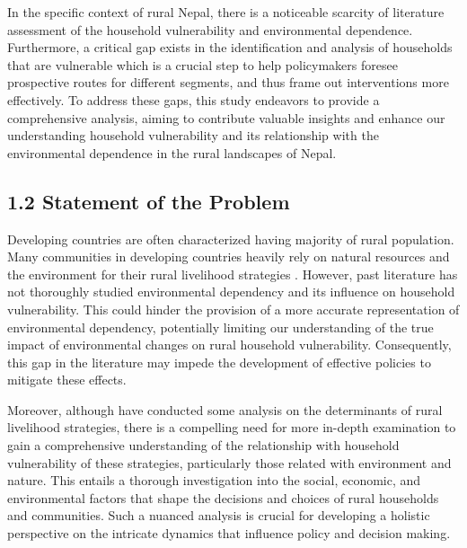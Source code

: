 \documentclass[12pt, a4paper]{article}
\begin{document}
In the specific context of rural Nepal, there is a noticeable scarcity of literature assessment of the household vulnerability and environmental dependence. Furthermore, a critical gap exists in the identification and analysis of households that are vulnerable which is a crucial step to help policymakers foresee prospective routes for different segments, and thus frame out interventions more effectively. To address these gaps, this study endeavors to provide a comprehensive analysis, aiming to contribute valuable insights and enhance our understanding household vulnerability and its relationship with the environmental dependence in the rural landscapes of Nepal.

\subsection*{1.2 Statement of the Problem }
\renewcommand{\thepage}{\arabic{page}}
Developing countries are often characterized having majority of rural population. Many communities in developing countries heavily rely on natural resources and the environment for their rural livelihood strategies \citep{adger2000social, ahmadpour2020factors, chambers1992sustainable, ellis1999rural}. However, past literature has not thoroughly studied environmental dependency and its influence on household vulnerability. This could hinder the provision of a more accurate representation of environmental dependency, potentially limiting our understanding of the true impact of environmental changes on rural household vulnerability. Consequently, this gap in the literature may impede the development of effective policies to mitigate these effects.

Moreover, although \citep{mao2020rural, shan2020determinants, lorato2019determinants} have conducted some analysis on the determinants of rural livelihood strategies, there is a compelling need for more in-depth examination to gain a comprehensive understanding of the relationship with household vulnerability of these strategies, particularly those related with environment and nature. This entails a thorough investigation into the social, economic, and environmental factors that shape the decisions and choices of rural households and communities. Such a nuanced analysis is crucial for developing a holistic perspective on the intricate dynamics that influence policy and decision making.
\end{document}
